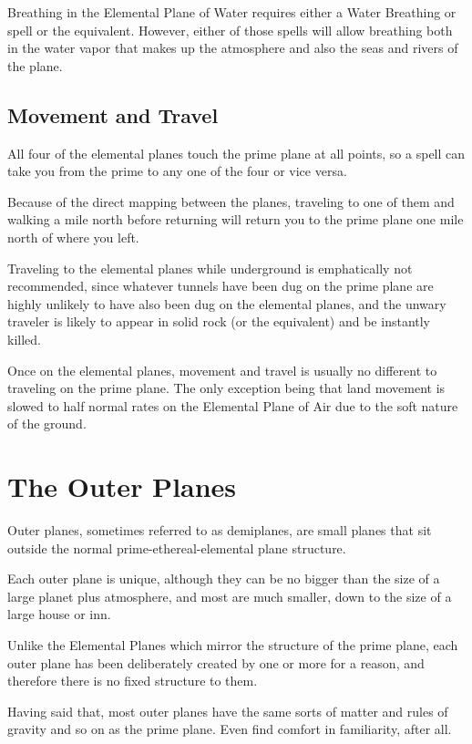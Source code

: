 \begin{multicols*}{2}
Breathing in the Elemental Plane of Water requires either a Water Breathing or  spell or the equivalent. However, either of those spells will allow breathing both in the water vapor that makes up the atmosphere and also the seas and rivers of the plane.

\subsection{Movement and Travel}
All four of the elemental planes touch the prime plane at all points, so a  spell can take you from the prime to any one of the four or vice versa.

Because of the direct mapping between the planes, traveling to one of them and walking a mile north before returning will return you to the prime plane one mile north of where you left.

Traveling to the elemental planes while underground is emphatically not recommended, since whatever tunnels have been dug on the prime plane are highly unlikely to have also been dug on the elemental planes, and the unwary traveler is likely to appear in solid rock (or the equivalent) and be instantly killed.

Once on the elemental planes, movement and travel is usually no different to traveling on the prime plane. The only exception being that land movement is slowed to half normal rates on the Elemental Plane of Air due to the soft nature of the ground.

\section{The Outer Planes}\label{sec:The Outer Planes}
Outer planes, sometimes referred to as demiplanes, are small planes that sit outside the normal prime-ethereal-elemental plane structure.

Each outer plane is unique, although they can be no bigger than the size of a large planet plus atmosphere, and most are much smaller, down to the size of a large house or inn.

Unlike the Elemental Planes which mirror the structure of the prime plane, each outer plane has been deliberately created by one or more  for a reason, and therefore there is no fixed structure to them.

Having said that, most outer planes have the same sorts of matter and rules of gravity and so on as the prime plane. Even  find comfort in familiarity, after all.


\end{multicols*}

